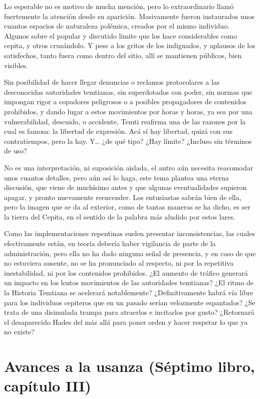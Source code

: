 \documentclass[
]{book}
\begin{document}
Lo esperable no es motivo de mucha mención, pero lo extraordinario llamó fuertemente la atención desde su aparición. Masivamente fueron instaurados unos cuantos espacios de naturaleza polémica, creados por el mismo individuo. Algunos sobre el popular y discutido limite que los hace considerables como cepita, y otros cruzándolo. Y pese a los gritos de los indignados, y aplausos de los satisfechos, tanto fuera como dentro del sitio, allí se mantienen públicos, bien visibles.

Sin posibilidad de hacer llegar denuncias o reclamos protocolares a las desconocidas autoridades temtianas, sin superdotados con poder, sin normas que impongan rigor a copadores peligrosos o a posibles propagadores de contenidos prohibidos, y dando lugar a estos movimientos por horas y horas, ya sea por una vulnerabilidad, descuido, o accidente, Temti reafirma una de las razones por la cual es famosa: la libertad de expresión. Acá sí hay libertad, quizá con sus contratiempos, pero la hay. Y\ldots{} ¿de qué tipo? ¿Hay límite? ¿Incluso sin términos de uso?

No es una interpretación, ni suposición aislada, el antro aún necesita reacomodar unos cuantos detalles, pero aún así lo haga, este tema plantea una eterna discusión, que viene de muchísimo antes y que algunas eventualidades supieron apagar, y pronto nuevamente reencender. Los entusiastas sabrán bien de ella, pero la imagen que se da al exterior, como de tantas maneras se ha dicho, es ser la tierra del Cepita, en el sentido de la palabra más aludido por estos lares.

Como las implementaciones repentinas suelen presentar inconsistencias, las cuales efectivamente están, en teoría debería haber vigilancia de parte de la administración, pero ella no ha dado ninguna señal de presencia, y en caso de que no estuviera ausente, no se ha pronunciado al respecto, ni por la repetitiva inestabilidad, ni por los contenidos prohibidos. ¿El aumento de tráfico generará un impacto en los lentos movimientos de las autoridades temtianas? ¿El ritmo de la Historia Temtiana se acelerará notablemente? ¿Definitivamente habrá vía libre para los individuos cepiteros que en un pasado serían velozmente espantados? ¿Se trata de una disimulada trampa para atraerlos e incitarlos por gusto? ¿Retornará el desaparecido Hades del más allá para poner orden y hacer respetar lo que ya no existe?

\hypertarget{avances-a-la-usanza-suxe9ptimo-libro-capuxedtulo-iii}{%
\section{Avances a la usanza (Séptimo libro, capítulo III)}\label{avances-a-la-usanza-suxe9ptimo-libro-capuxedtulo-iii}}
\end{document}
